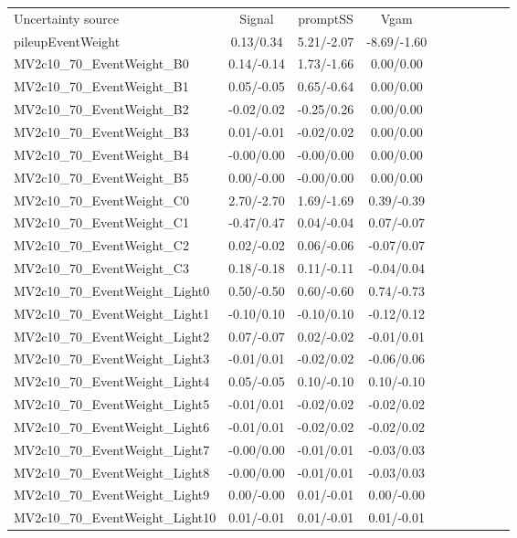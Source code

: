 \begin{table}[h]
\scriptsize
\begin{center}
\begin{tabular}{l|ccccccccc}
\hline
\hline
Uncertainty source &Signal &promptSS &Vgam \\
pileupEventWeight &0.13/0.34 &5.21/-2.07 &-8.69/-1.60 \\
MV2c10\_70\_EventWeight\_B0 &0.14/-0.14 &1.73/-1.66 &0.00/0.00 \\
MV2c10\_70\_EventWeight\_B1 &0.05/-0.05 &0.65/-0.64 &0.00/0.00 \\
MV2c10\_70\_EventWeight\_B2 &-0.02/0.02 &-0.25/0.26 &0.00/0.00 \\
MV2c10\_70\_EventWeight\_B3 &0.01/-0.01 &-0.02/0.02 &0.00/0.00 \\
MV2c10\_70\_EventWeight\_B4 &-0.00/0.00 &-0.00/0.00 &0.00/0.00 \\
MV2c10\_70\_EventWeight\_B5 &0.00/-0.00 &-0.00/0.00 &0.00/0.00 \\
MV2c10\_70\_EventWeight\_C0 &2.70/-2.70 &1.69/-1.69 &0.39/-0.39 \\
MV2c10\_70\_EventWeight\_C1 &-0.47/0.47 &0.04/-0.04 &0.07/-0.07 \\
MV2c10\_70\_EventWeight\_C2 &0.02/-0.02 &0.06/-0.06 &-0.07/0.07 \\
MV2c10\_70\_EventWeight\_C3 &0.18/-0.18 &0.11/-0.11 &-0.04/0.04 \\
MV2c10\_70\_EventWeight\_Light0 &0.50/-0.50 &0.60/-0.60 &0.74/-0.73 \\
MV2c10\_70\_EventWeight\_Light1 &-0.10/0.10 &-0.10/0.10 &-0.12/0.12 \\
MV2c10\_70\_EventWeight\_Light2 &0.07/-0.07 &0.02/-0.02 &-0.01/0.01 \\
MV2c10\_70\_EventWeight\_Light3 &-0.01/0.01 &-0.02/0.02 &-0.06/0.06 \\
MV2c10\_70\_EventWeight\_Light4 &0.05/-0.05 &0.10/-0.10 &0.10/-0.10 \\
MV2c10\_70\_EventWeight\_Light5 &-0.01/0.01 &-0.02/0.02 &-0.02/0.02 \\
MV2c10\_70\_EventWeight\_Light6 &-0.01/0.01 &-0.02/0.02 &-0.02/0.02 \\
MV2c10\_70\_EventWeight\_Light7 &-0.00/0.00 &-0.01/0.01 &-0.03/0.03 \\
MV2c10\_70\_EventWeight\_Light8 &-0.00/0.00 &-0.01/0.01 &-0.03/0.03 \\
MV2c10\_70\_EventWeight\_Light9 &0.00/-0.00 &0.01/-0.01 &0.00/-0.00 \\
MV2c10\_70\_EventWeight\_Light10 &0.01/-0.01 &0.01/-0.01 &0.01/-0.01 \\

\end{tabular}
\end{center}
\end{table}
